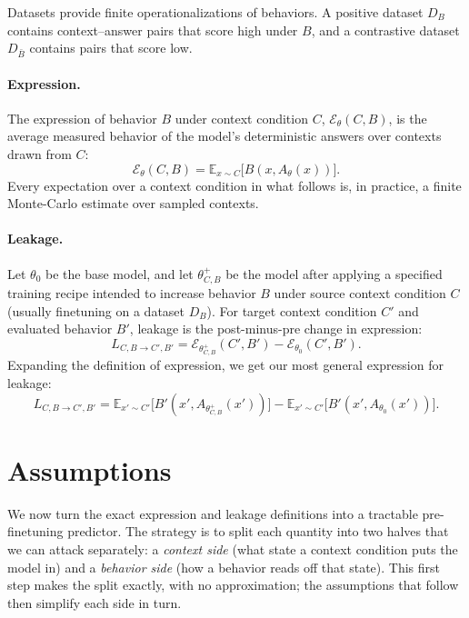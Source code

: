 \documentclass[11pt]{article}
\theoremstyle{definition}
\theoremstyle{definition}
\theoremstyle{assumptionstyle}
\newcommand{\E}{\mathbb{E}}            %
\newcommand{\Expr}{\mathcal{E}}        %
\begin{document}
Datasets provide finite operationalizations of behaviors. A positive dataset
\(D_B\) contains context--answer pairs that score high under \(B\), and a contrastive dataset \(D_{\bar B}\) contains pairs that score low.
\paragraph{Expression.}
The expression of behavior \(B\) under context condition \(C\),
\(\Expr_\theta(C,B)\), is the average measured behavior of the model's
deterministic answers over contexts drawn from \(C\):
\begin{equation}
\Expr_\theta(C,B)
=
\E_{x\sim C}
\big[
B(x,A_\theta(x))
\big].
\label{eq:expression}
\end{equation}
Every expectation over a context condition in what follows is, in practice, a
finite Monte-Carlo estimate over sampled contexts.

\paragraph{Leakage.}
Let \(\theta_0\) be the base model, and let \(\theta^+_{C,B}\) be the model
after applying a specified training recipe intended to increase behavior \(B\)
under source context condition \(C\) (usually finetuning on a dataset $D_B$). For target context condition \(C'\) and
evaluated behavior \(B'\), leakage is the post-minus-pre change in expression:
\begin{equation}
L_{C,B\to C',B'}
=
\Expr_{\theta^+_{C,B}}(C',B')
-
\Expr_{\theta_0}(C',B').
\label{eq:leakage}
\end{equation}
Expanding the definition of expression, we get our most general expression for leakage:
\begin{equation}
L_{C,B\to C',B'}
=
\E_{x'\sim C'}
\big[
B'(x',A_{\theta^+_{C,B}}(x'))
\big]
-
\E_{x'\sim C'}
\big[
B'(x',A_{\theta_0}(x'))
\big].
\label{eq:leakage-expanded}
\end{equation}


\section{Assumptions}
\label{sec:assumptions}
We now turn the exact expression and leakage definitions into a tractable
pre-finetuning predictor. The strategy is to split each quantity into two halves
that we can attack separately: a \emph{context side} (what state a context
condition puts the model in) and a \emph{behavior side} (how a behavior reads off
that state). This first step makes the split exactly, with no approximation; the
assumptions that follow then simplify each side in turn.
\end{document}
